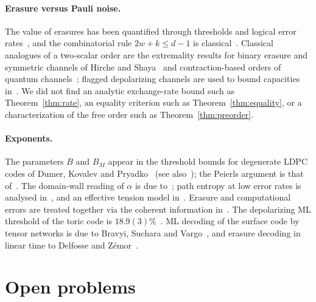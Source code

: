 \documentclass[11pt,a4paper]{article}
\theoremstyle{plain}
\theoremstyle{definition}
\theoremstyle{remark}
\begin{document}
\paragraph{Erasure versus Pauli noise.}
The value of erasures has been quantified through thresholds and logical error rates~\cite{SBD,WKPT,Sahay,KubicaErasure,Chang,GRK,GVRK}, and the combinatorial rule $2w+k\le d-1$ is classical~\cite{GBP}. Classical analogues of a two-scalar order are the extremality results for binary erasure and symmetric channels of Hirche and Shaya~\cite{HircheShaya} and contraction-based orders of quantum channels~\cite{HRSF}; flagged depolarizing channels are used to bound capacities in~\cite{FKG}. We did not find an analytic exchange-rate bound such as Theorem~\ref{thm:rate}, an equality criterion such as Theorem~\ref{thm:equality}, or a characterization of the free order such as Theorem~\ref{thm:preorder}.

\paragraph{Exponents.}
The parameters $B$ and $B_M$ appear in the threshold bounds for degenerate LDPC codes of Dumer, Kovalev and Pryadko~\cite{DKP} (see also~\cite{KovalevPryadko,KPDP}); the Peierls argument is that of~\cite{DKLP}. The domain-wall reading of $\alpha$ is due to~\cite{DKLP,CF}; path entropy at low error rates is analysed in~\cite{WatsonBarrett,BBKM}, and an effective tension model in~\cite{English}. Erasure and computational errors are treated together via the coherent information in~\cite{Colmenarez}. The depolarizing ML threshold of the toric code is $18.9(3)\%$~\cite{Bombin}. ML decoding of the surface code by tensor networks is due to Bravyi, Suchara and Vargo~\cite{BSV}, and erasure decoding in linear time to Delfosse and Z\'emor~\cite{DZ}.

\section{Open problems}\label{sec:open}
\end{document}
